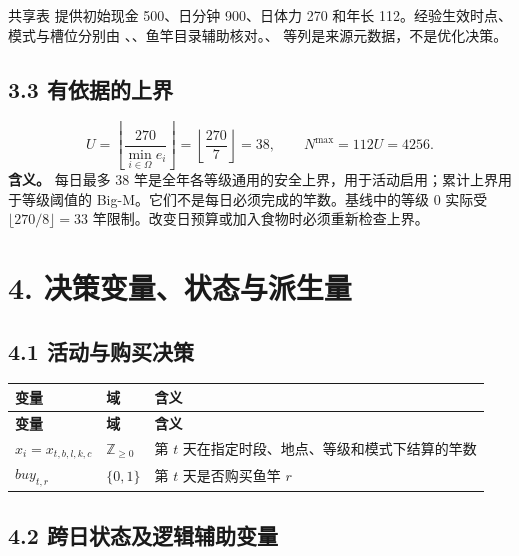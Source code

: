 \documentclass[11pt,a4paper]{article}
\begin{document}
共享表  提供初始现金 500、日分钟 900、日体力 270 和年长 112。经验生效时点、模式与槽位分别由 、、鱼竿目录辅助核对。、 等列是来源元数据，不是优化决策。\par

\subsection*{3.3 有依据的上界}

\begin{samepage}
\[
U=\left\lfloor\frac{270}{\min_{i\in\Omega}e_i}\right\rfloor
=\left\lfloor\frac{270}{7}\right\rfloor=38,
\qquad N^{\max}=112U=4256. \tag{D6}
\]
\textbf{含义。} 每日最多 38 竿是全年各等级通用的安全上界，用于活动启用；累计上界用于等级阈值的 Big-M。它们不是每日必须完成的竿数。基线中的等级 0 实际受 $\lfloor270/8\rfloor=33$ 竿限制。改变日预算或加入食物时必须重新检查上界。\par
\end{samepage}

\section*{\color{modelblue}4. 决策变量、状态与派生量}

\subsection*{4.1 活动与购买决策}

{\small\begin{longtable}{L{0.23\dimexpr\textwidth-30pt\relax}L{0.21\dimexpr\textwidth-30pt\relax}L{0.56\dimexpr\textwidth-30pt\relax}}\toprule
\textbf{变量} & \textbf{域} & \textbf{含义}\\\midrule\endfirsthead
\textbf{变量} & \textbf{域} & \textbf{含义}\\\midrule\endhead
\bottomrule\endfoot
$x_i=x_{t,b,l,k,c}$ & $\mathbb Z_{\ge0}$ & 第 $t$ 天在指定时段、地点、等级和模式下结算的竿数\\
$buy_{t,r}$ & $\{0,1\}$ & 第 $t$ 天是否购买鱼竿 $r$\\
\end{longtable}}

\subsection*{4.2 跨日状态及逻辑辅助变量}
\end{document}
